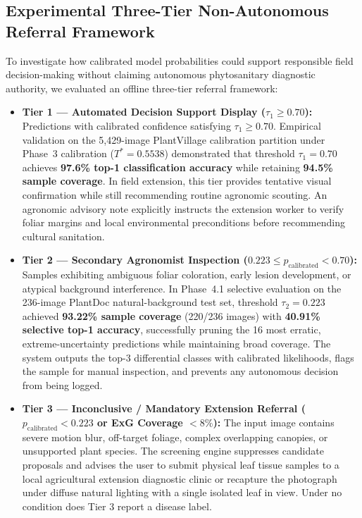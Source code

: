 \documentclass[pdflatex,sn-mathphys-num]{sn-jnl}
\theoremstyle{thmstyleone}%
\theoremstyle{thmstyletwo}%
\theoremstyle{thmstylethree}%
\begin{document}
\begin{appendices}
\subsection{Experimental Three-Tier Non-Autonomous Referral Framework}
To investigate how calibrated model probabilities could support responsible field decision-making without claiming autonomous phytosanitary diagnostic authority, we evaluated an offline three-tier referral framework:
\begin{itemize}
  \item \textbf{Tier 1 --- Automated Decision Support Display ($\tau_1 \ge 0.70$):} Predictions with calibrated confidence satisfying $\tau_1 \ge 0.70$. Empirical validation on the 5{,}429-image PlantVillage calibration partition under Phase~3 calibration ($T^* = 0.5538$) demonstrated that threshold $\tau_1 = 0.70$ achieves \textbf{97.6\% top-1 classification accuracy} while retaining \textbf{94.5\% sample coverage}. In field extension, this tier provides tentative visual confirmation while still recommending routine agronomic scouting. An agronomic advisory note explicitly instructs the extension worker to verify foliar margins and local environmental preconditions before recommending cultural sanitation.
  \item \textbf{Tier 2 --- Secondary Agronomist Inspection ($0.223 \le p_{\text{calibrated}} < 0.70$):} Samples exhibiting ambiguous foliar coloration, early lesion development, or atypical background interference. In Phase~4.1 selective evaluation on the 236-image PlantDoc natural-background test set, threshold $\tau_2 = 0.223$ achieved \textbf{93.22\% sample coverage} (220/236 images) with \textbf{40.91\% selective top-1 accuracy}, successfully pruning the 16 most erratic, extreme-uncertainty predictions while maintaining broad coverage. The system outputs the top-3 differential classes with calibrated likelihoods, flags the sample for manual inspection, and prevents any autonomous decision from being logged.
  \item \textbf{Tier 3 --- Inconclusive / Mandatory Extension Referral ($p_{\text{calibrated}} < 0.223$ or ExG Coverage $< 8\%$):} The input image contains severe motion blur, off-target foliage, complex overlapping canopies, or unsupported plant species. The screening engine suppresses candidate proposals and advises the user to submit physical leaf tissue samples to a local agricultural extension diagnostic clinic or recapture the photograph under diffuse natural lighting with a single isolated leaf in view. Under no condition does Tier 3 report a disease label.
\end{itemize}


\end{appendices}
\end{document}
